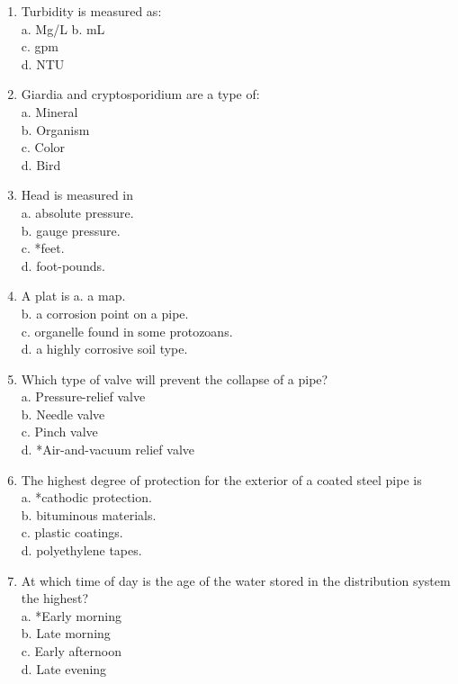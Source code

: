 \documentclass[10pt]{article}
\begin{document}
\begin{enumerate}
\item  Turbidity is measured as:\\
a.  Mg/L
b.  mL\\
c.  gpm\\
d.  NTU\\

\item  Giardia and cryptosporidium are a type of:\\
a.  Mineral\\
b.  Organism\\
c.  Color\\
d.  Bird\\



\item Head is measured in\\
a. absolute pressure.\\
b. gauge pressure.\\
c. *feet.\\
d. foot-pounds.

\item A plat is
a. a map.\\
b. a corrosion point on a pipe.\\
c. organelle found in some protozoans.\\
d. a highly corrosive soil type.

\item Which type of valve will prevent the collapse of a pipe?\\
a. Pressure-relief valve\\
b. Needle valve\\
c. Pinch valve\\
d. *Air-and-vacuum relief valve

  \item The highest degree of protection for the exterior of a coated steel pipe is\\
a. *cathodic protection.\\
b. bituminous materials.\\
c. plastic coatings.\\
d. polyethylene tapes.

  \item At which time of day is the age of the water stored in the distribution system the highest?\\
a. *Early morning\\
b. Late morning\\
c. Early afternoon\\
d. Late evening


\end{enumerate}
\end{document}
